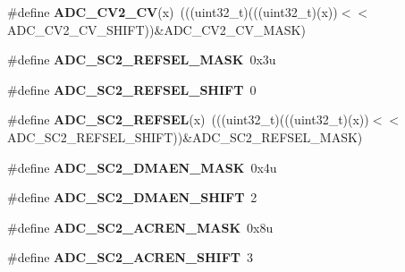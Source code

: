 \begin{DoxyCompactItemize}
\item 
\#define {\bfseries A\+D\+C\+\_\+\+C\+V2\+\_\+\+CV}(x)~(((uint32\+\_\+t)(((uint32\+\_\+t)(x))$<$$<$A\+D\+C\+\_\+\+C\+V2\+\_\+\+C\+V\+\_\+\+S\+H\+I\+FT))\&A\+D\+C\+\_\+\+C\+V2\+\_\+\+C\+V\+\_\+\+M\+A\+SK)\hypertarget{group__ADC__Register__Masks_gaa4d71a13e422a14048307c0acab90841}{}\label{group__ADC__Register__Masks_gaa4d71a13e422a14048307c0acab90841}

\item 
\#define {\bfseries A\+D\+C\+\_\+\+S\+C2\+\_\+\+R\+E\+F\+S\+E\+L\+\_\+\+M\+A\+SK}~0x3u\hypertarget{group__ADC__Register__Masks_gaa821d1e2e4575c757e9446da61b2230a}{}\label{group__ADC__Register__Masks_gaa821d1e2e4575c757e9446da61b2230a}

\item 
\#define {\bfseries A\+D\+C\+\_\+\+S\+C2\+\_\+\+R\+E\+F\+S\+E\+L\+\_\+\+S\+H\+I\+FT}~0\hypertarget{group__ADC__Register__Masks_gaab9b293eb54de2d9d246766002e44556}{}\label{group__ADC__Register__Masks_gaab9b293eb54de2d9d246766002e44556}

\item 
\#define {\bfseries A\+D\+C\+\_\+\+S\+C2\+\_\+\+R\+E\+F\+S\+EL}(x)~(((uint32\+\_\+t)(((uint32\+\_\+t)(x))$<$$<$A\+D\+C\+\_\+\+S\+C2\+\_\+\+R\+E\+F\+S\+E\+L\+\_\+\+S\+H\+I\+FT))\&A\+D\+C\+\_\+\+S\+C2\+\_\+\+R\+E\+F\+S\+E\+L\+\_\+\+M\+A\+SK)\hypertarget{group__ADC__Register__Masks_gacac3b41d5c2bb74a8c614f200f0c0a36}{}\label{group__ADC__Register__Masks_gacac3b41d5c2bb74a8c614f200f0c0a36}

\item 
\#define {\bfseries A\+D\+C\+\_\+\+S\+C2\+\_\+\+D\+M\+A\+E\+N\+\_\+\+M\+A\+SK}~0x4u\hypertarget{group__ADC__Register__Masks_ga50fc5fed4844c3ceb8da9b595029da11}{}\label{group__ADC__Register__Masks_ga50fc5fed4844c3ceb8da9b595029da11}

\item 
\#define {\bfseries A\+D\+C\+\_\+\+S\+C2\+\_\+\+D\+M\+A\+E\+N\+\_\+\+S\+H\+I\+FT}~2\hypertarget{group__ADC__Register__Masks_ga5554f538c0c6d7b3e2dfa502fdfed488}{}\label{group__ADC__Register__Masks_ga5554f538c0c6d7b3e2dfa502fdfed488}

\item 
\#define {\bfseries A\+D\+C\+\_\+\+S\+C2\+\_\+\+A\+C\+R\+E\+N\+\_\+\+M\+A\+SK}~0x8u\hypertarget{group__ADC__Register__Masks_ga25f7f0c6a6513cbfbd4684513b373f9c}{}\label{group__ADC__Register__Masks_ga25f7f0c6a6513cbfbd4684513b373f9c}

\item 
\#define {\bfseries A\+D\+C\+\_\+\+S\+C2\+\_\+\+A\+C\+R\+E\+N\+\_\+\+S\+H\+I\+FT}~3\hypertarget{group__ADC__Register__Masks_ga34954b7e5cb86e290b281e2f97b63187}{}\label{group__ADC__Register__Masks_ga34954b7e5cb86e290b281e2f97b63187}


\end{DoxyCompactItemize}
